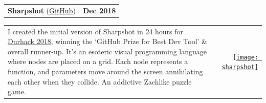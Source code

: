 \documentclass[hidelinks, 12pt, a4paper]{article}
\begin{document}
	\vspace{24pt}
	
	\begin{tabularx}{\linewidth}{X r}
		\textbf{Sharpshot} (\href{https://github.com/stevenwaterman/sharpshot}{GitHub}) & \textbf{Dec 2018}
	\end{tabularx}\vspace{2pt}
	
	\hspace{0.05\linewidth}\begin{tabularx}{0.95\linewidth}{Xr}
		\begin{minipage}{\linewidth}
				I created the initial version of Sharpshot in 24 hours for \href{http://www.durhack.com}{Durhack 2018}, winning the `GitHub Prize for Best Dev Tool' \& overall runner-up. It's an esoteric visual programming language where nodes are placed on a grid. Each node represents a function, and parameters move around the screen annihilating each other when they collide. An addictive Zachlike puzzle game.
		\end{minipage} & \href{https://github.com/stevenwaterman/sharpshot}{\texttt{[image: sharpshot]}}
	\end{tabularx}
\end{document}
